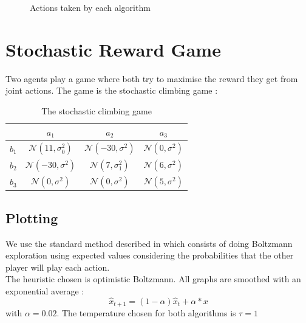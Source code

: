 \documentclass[a4paper]{article}
\begin{document}
\begin{figure}[H]
	\caption{Actions taken by each algorithm}
	\label{ex13a}
\end{figure}

\section{Stochastic Reward Game}
Two agents play a game where both try to maximise the reward they get from
joint actions. The game is the stochastic climbing game :

\begin{table}[H]
\centering
\begin{tabular}{c|c|c|c}
	& $a_1$ & $a_2$ & $a_3$ \\ \hline
	$b_1$ & $\mathcal{N}(11, \sigma_0^2)$ & $\mathcal{N}(-30, \sigma^2)$
		& $\mathcal{N}(0, \sigma^2)$ \\ \hline 
	$b_2$ & $\mathcal{N}(-30, \sigma^2)$ & $\mathcal{N}(7, \sigma_1^2)$
		& $\mathcal{N}(6, \sigma^2)$ \\ \hline 
	$b_3$ & $\mathcal{N}(0, \sigma^2)$ & $\mathcal{N}(0, \sigma^2)$
		& $\mathcal{N}(5, \sigma^2)$ 
\end{tabular}
\caption{The stochastic climbing game}
\label{banditparams}
\end{table}

\subsection{Plotting}
We use the standard method described in \cite{claus} which consists of doing
Boltzmann exploration using expected values considering the probabilities that
the other player will play each action.\\

The heuristic chosen is optimistic Boltzmann. All graphs are smoothed with
an exponential average :
$$ \widehat{x}_{t+1} = (1-\alpha)\widehat{x}_t + \alpha * x $$
with $\alpha = 0.02$. The temperature chosen for both algorithms is $\tau=1$\\
\end{document}
